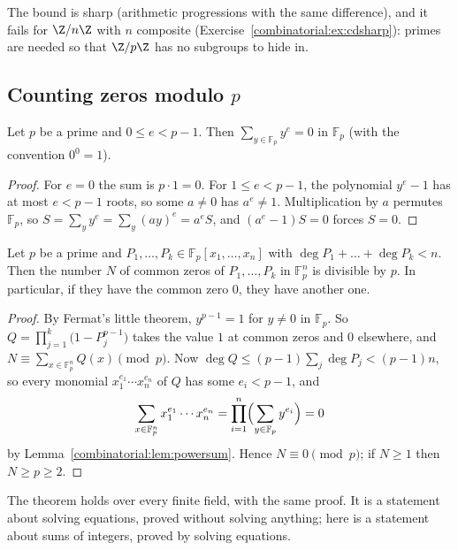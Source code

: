 The bound is sharp (arithmetic progressions with the same difference), and it fails for $\Z/n\Z$ with $n$ composite (Exercise~\ref{combinatorial:ex:cdsharp}): primes are needed so that $\Z/p\Z$ has no subgroups to hide in.

\subsection*{Counting zeros modulo $p$}

\begin{lemma}\label{combinatorial:lem:powersum}
Let $p$ be a prime and $0\le e<p-1$. Then $\sum_{y\in\mathbb F_p}y^e=0$ in $\mathbb F_p$ (with the convention $0^0=1$).
\end{lemma}
\begin{proof}
For $e=0$ the sum is $p\cdot1=0$. For $1\le e<p-1$, the polynomial $y^e-1$ has at most $e<p-1$ roots, so some $a\ne0$ has $a^e\ne1$. Multiplication by $a$ permutes $\mathbb F_p$, so
$S=\sum_yy^e=\sum_y(ay)^e=a^eS$, and $(a^e-1)S=0$ forces $S=0$.
\end{proof}

\begin{theorem}\label{combinatorial:thm:cw}
Let $p$ be a prime and $P_1,\dots,P_k\in\mathbb F_p[x_1,\dots,x_n]$ with $\deg P_1+\dots+\deg P_k<n$. Then the number $N$ of common zeros of $P_1,\dots,P_k$ in $\mathbb F_p^n$ is divisible by $p$. In particular, if they
have the common zero $0$, they have another one.
\end{theorem}
\begin{proof}
By Fermat's little theorem, $y^{p-1}=1$ for $y\ne0$ in $\mathbb F_p$. So $Q=\prod_{j=1}^k\bigl(1-P_j^{p-1}\bigr)$ takes the value $1$ at common zeros and $0$ elsewhere, and $N\equiv\sum_{x\in\mathbb F_p^n}Q(x)\pmod p$. Now
$\deg Q\le(p-1)\sum_j\deg P_j<(p-1)n$, so every monomial $x_1^{e_1}\cdots x_n^{e_n}$ of $Q$ has some $e_i<p-1$, and
\[
\sum_{x\in\mathbb F_p^n}x_1^{e_1}\cdots x_n^{e_n}=\prod_{i=1}^n\Bigl(\sum_{y\in\mathbb F_p}y^{e_i}\Bigr)=0
\]
by Lemma~\ref{combinatorial:lem:powersum}. Hence $N\equiv0\pmod p$; if $N\ge1$ then $N\ge p\ge2$.
\end{proof}

The theorem holds over every finite field, with the same proof. It is a statement about solving equations, proved without solving anything; here is a statement about sums of integers, proved by solving equations.

